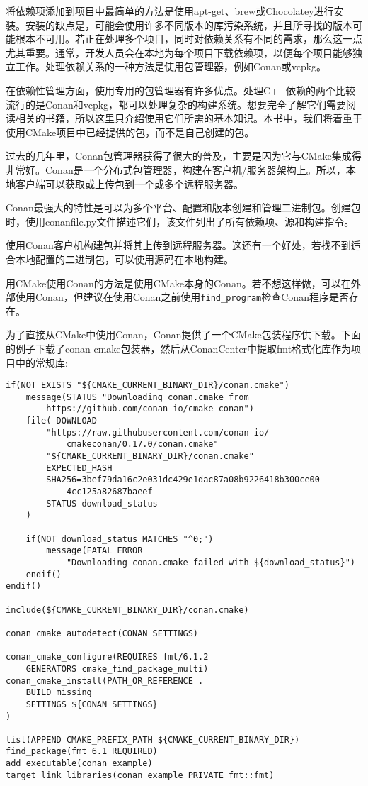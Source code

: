 
将依赖项添加到项目中最简单的方法是使用apt-get、brew或Chocolatey进行安装。安装的缺点是，可能会使用许多不同版本的库污染系统，并且所寻找的版本可能根本不可用。若正在处理多个项目，同时对依赖关系有不同的需求，那么这一点尤其重要。通常，开发人员会在本地为每个项目下载依赖项，以便每个项目能够独立工作。处理依赖关系的一种方法是使用包管理器，例如Conan或vcpkg。

在依赖性管理方面，使用专用的包管理器有许多优点。处理C++依赖的两个比较流行的是Conan和vcpkg，都可以处理复杂的构建系统。想要完全了解它们需要阅读相关的书籍，所以这里只介绍使用它们所需的基本知识。本书中，我们将着重于使用CMake项目中已经提供的包，而不是自己创建的包。


过去的几年里，Conan包管理器获得了很大的普及，主要是因为它与CMake集成得非常好。Conan是一个分布式包管理器，构建在客户机/服务器架构上。所以，本地客户端可以获取或上传包到一个或多个远程服务器。

Conan最强大的特性是可以为多个平台、配置和版本创建和管理二进制包。创建包时，使用conanfile.py文件描述它们，该文件列出了所有依赖项、源和构建指令。

使用Conan客户机构建包并将其上传到远程服务器。这还有一个好处，若找不到适合本地配置的二进制包，可以使用源码在本地构建。

用CMake使用Conan的方法是使用CMake本身的Conan。若不想这样做，可以在外部使用Conan，但建议在使用Conan之前使用\texttt{find\_program}检查Conan程序是否存在。

为了直接从CMake中使用Conan，Conan提供了一个CMake包装程序供下载。下面的例子下载了conan-cmake包装器，然后从ConanCenter中提取fmt格式化库作为项目中的常规库:

\begin{lstlisting}[style=styleCMake]
if(NOT EXISTS "${CMAKE_CURRENT_BINARY_DIR}/conan.cmake")
	message(STATUS "Downloading conan.cmake from
		https://github.com/conan-io/cmake-conan")
	file( DOWNLOAD
		"https://raw.githubusercontent.com/conan-io/
			cmakeconan/0.17.0/conan.cmake"
		"${CMAKE_CURRENT_BINARY_DIR}/conan.cmake"
		EXPECTED_HASH
		SHA256=3bef79da16c2e031dc429e1dac87a08b9226418b300ce00
			4cc125a82687baeef
		STATUS download_status
	)
	
	if(NOT download_status MATCHES "^0;")
		message(FATAL_ERROR
			"Downloading conan.cmake failed with ${download_status}")
	endif()
endif()

include(${CMAKE_CURRENT_BINARY_DIR}/conan.cmake)

conan_cmake_autodetect(CONAN_SETTINGS)

conan_cmake_configure(REQUIRES fmt/6.1.2
	GENERATORS cmake_find_package_multi)
conan_cmake_install(PATH_OR_REFERENCE .
	BUILD missing
	SETTINGS ${CONAN_SETTINGS}
)

list(APPEND CMAKE_PREFIX_PATH ${CMAKE_CURRENT_BINARY_DIR})
find_package(fmt 6.1 REQUIRED)
add_executable(conan_example)
target_link_libraries(conan_example PRIVATE fmt::fmt)
\end{lstlisting}


